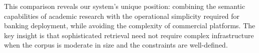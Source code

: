 This comparison reveals our system's unique position: combining the semantic capabilities of academic research with the operational simplicity required for banking deployment, while avoiding the complexity of commercial platforms. The key insight is that sophisticated retrieval need not require complex infrastructure when the corpus is moderate in size and the constraints are well-defined.

